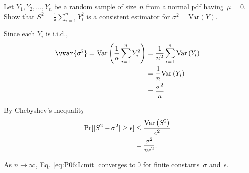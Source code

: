 \begin{problem}
  Let ${Y_1,Y_2,\ldots,Y_n}$ be a random sample of size~$n$ from a normal pdf having~${\mu = 0}$.  Show that ${S^2 = \frac{1}{n} \sum_{i=1}^{n} Y_{i}^2}$ is a consistent estimator for ${\sigma^{2} = \text{Var}(Y)}$.
\end{problem}

Since each $Y_i$ is i.i.d.,
\begin{align}
  \vvar{\sigma^2} = \var{\frac{1}{n}\sum_{i=1}^{n} Y_{i}^{2}} &= \frac{1}{n^{2}} \sum_{i=1}^{n}\var{Y_i} \\
                                                              &= \frac{1}{n} \var{Y_i} \\
                                                              &= \frac{\sigma^2}{n}
\end{align}

By Chebyshev's Inequality
\begin{align}
  \Pr\lbrack\lvert S^2 - \sigma^2\rvert \geq \epsilon\rbrack &\leq \frac{\text{Var}\left(S^2\right)}{\epsilon^2} \\
                                                 &= \frac{\sigma^2}{n\epsilon^2}\text{.}\label{eq:P06:Limit}
\end{align}

As ${n \rightarrow \infty}$, Eq.~\eqref{eq:P06:Limit} converges to 0 for finite constants~$\sigma$ and~$\epsilon$.
